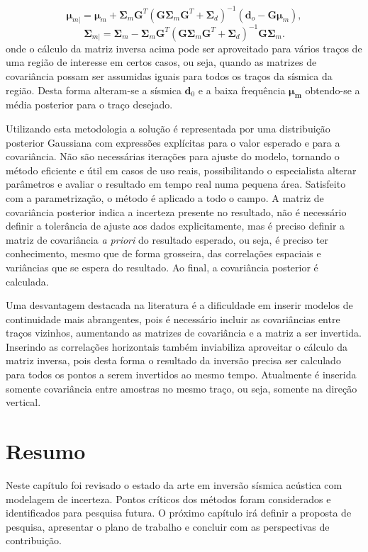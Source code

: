 \begin{equation}
\label{eqn:mapSolution}
\boldsymbol{\mu}_{m|} = \boldsymbol{\mu}_{m} + \boldsymbol{\Sigma}_{m}\boldsymbol{G}^{T}(\boldsymbol{G\Sigma}_{m}\boldsymbol{G}^{T}+\boldsymbol{\Sigma}_{d})^{-1}\left ( \boldsymbol{d}_{o} - \boldsymbol{G\mu}_{m} \right ),
\end{equation}
\begin{equation}
\boldsymbol{\Sigma}_{m|} = \boldsymbol{\Sigma}_{m} - \boldsymbol{\Sigma}_{m}\boldsymbol{G}^{T}(\boldsymbol{G\Sigma}_{m}\boldsymbol{G}^{T}+\boldsymbol{\Sigma}_{d})^{-1}\boldsymbol{G\Sigma}_{m}.
\end{equation} 
onde o cálculo da matriz inversa acima pode ser aproveitado para vários traços
de uma região de interesse em certos casos, ou seja, quando as matrizes de
covariância possam ser assumidas iguais para todos os traços da sísmica da região.
Desta forma alteram-se a sísmica $\mathbf{d}_0$ e a baixa frequência
$\boldsymbol{\mu_m}$ obtendo-se a média posterior para o traço desejado.


Utilizando esta metodologia a solução é representada por uma distribuição
posterior Gaussiana com expressões explícitas para o valor esperado e para a
covariância. Não são necessárias iterações para ajuste do modelo, tornando o
método eficiente e útil em casos de uso reais, possibilitando o especialista
alterar parâmetros e avaliar o resultado em tempo real numa pequena área.
Satisfeito com a parametrização, o método é aplicado a todo o campo. A matriz de
covariância posterior indica a incerteza presente no resultado, não é necessário
definir a tolerância de ajuste aos dados explicitamente, mas é preciso definir a
matriz de covariância \textit{a priori} do resultado esperado, ou seja, é
preciso ter conhecimento, mesmo que de forma grosseira, das correlações espaciais e
variâncias que se espera do resultado. Ao final, a covariância posterior é
calculada.

Uma desvantagem destacada na literatura é a dificuldade em inserir modelos de
continuidade mais abrangentes, pois é necessário incluir as covariâncias entre
traços vizinhos, aumentando as matrizes de covariância e a matriz a ser
invertida. Inserindo as correlações horizontais também inviabiliza aproveitar o
cálculo da matriz inversa, pois desta forma o resultado da inversão precisa ser
calculado para todos os pontos a serem invertidos ao mesmo tempo.
Atualmente é inserida somente covariância entre amostras no mesmo traço, ou
seja, somente na direção vertical.


\section{Resumo}

Neste capítulo foi revisado o estado da arte em inversão sísmica acústica
com modelagem de incerteza. Pontos críticos dos métodos foram considerados e
identificados para pesquisa futura. O próximo capítulo irá definir a proposta de
pesquisa, apresentar o plano de trabalho e concluir com as perspectivas de
contribuição.
